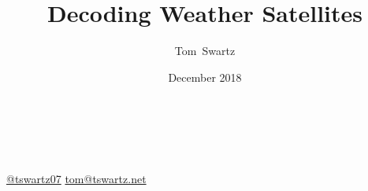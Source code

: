 \documentclass[]{beamer}
\title{Decoding Weather Satellites}
\author[Swartz]{Tom~Swartz}
\institute{Central PA Open Source Conference 2018}
\date{December 2018}
\begin{document}
{
\begin{frame}[plain]
    \vspace{17em}
    \begin{TitleBox}
        \begin{center}
            {\color{red}\huge\inserttitle\color{black}}\\
        \end{center}
        \insertauthor{}\hfill\insertinstitute{}\\
        {\footnotesize
        \href{http://twitter.com/tswartz07}{@tswartz07}
        \hfill
        \href{mailto: tom@tswartz.net}{tom@tswartz.net}
        }
    \end{TitleBox}
\end{frame}}
\end{document}
